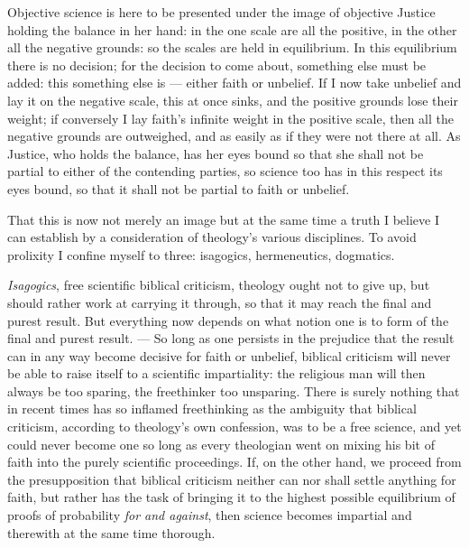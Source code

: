 \documentclass[12pt,a4paper]{book}
\begin{document}
Objective science is here to be presented under the image of objective Justice holding the balance in
her hand: in the one scale are all the positive, in the other all the negative grounds: so the scales
are held in equilibrium. In this equilibrium there is no decision; for the decision to come about,
something else must be added: this something else is --- either faith or unbelief. If I now take
unbelief and lay it on the negative scale, this at once sinks, and the positive grounds lose their
weight; if conversely I lay faith's infinite weight in the positive scale, then all the negative
grounds are outweighed, and as easily as if they were not there at all. As Justice, who holds the
balance, has her eyes bound so that she shall not be partial to either of the contending parties, so
science too has in this respect its eyes bound, so that it shall not be partial to faith or unbelief.

That this is now not merely an image but at the same time a truth I believe I can establish by a
consideration of theology's various disciplines. To avoid prolixity I confine myself to three:
isagogics, hermeneutics, dogmatics.

\emph{Isagogics}, free scientific biblical criticism, theology ought not to give up, but should
rather work at carrying it
through, so that it may reach the final and purest result. But everything now depends on what notion
one is to form of the final and purest result. --- So long as one persists in the prejudice that the
result can in any way become decisive for faith or unbelief, biblical criticism will never be able to
raise itself to a scientific impartiality: the religious man will then always be too sparing, the
freethinker too unsparing. There is surely nothing that in recent times has so inflamed freethinking
as the ambiguity that biblical criticism, according to theology's own confession, was to be a free
science, and yet could never become one so long as every theologian went on mixing his bit of faith
into the purely scientific proceedings. If, on the other hand, we proceed from the presupposition
that biblical criticism neither can nor shall settle anything for faith, but rather has the task of
bringing it to the highest possible equilibrium of proofs of probability \emph{for and against}, then
science becomes impartial and therewith at the same time thorough.
\end{document}
